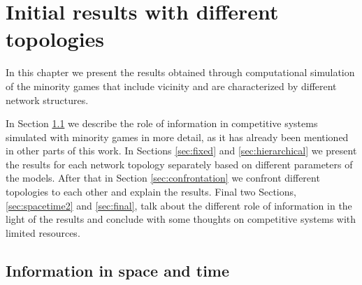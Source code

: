 \chapter{Initial results with different topologies}
\label{chapter:results}

In this chapter we present the results obtained through computational simulation of the minority games that include vicinity and are characterized by different network structures.

In Section \ref{sec:spacetime} we describe the role of information in competitive systems simulated with minority games in more detail, as it has already been mentioned in other parts of this work.
In Sections \ref{sec:fixed} and \ref{sec:hierarchical} we present the results for each network topology separately based on different parameters of the models.
After that in Section \ref{sec:confrontation} we confront different topologies to each other and explain the results.
Final two Sections, \ref{sec:spacetime2} and \ref{sec:final}, talk about the different role of information in the light of the results and conclude with some thoughts on competitive systems with limited resources. 

\section{Information in space and time}
\label{sec:spacetime}

